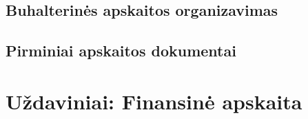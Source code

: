 \section{Buhalterinės apskaitos organizavimas}



\section{Pirminiai apskaitos dokumentai}



\chapter{Uždaviniai: Finansinė apskaita}


